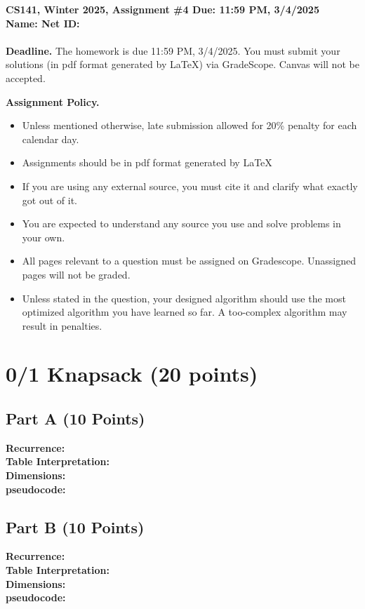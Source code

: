 \documentclass{article}[12pt]
\newcommand{\policy}[1]{#1}
\newcommand{\policy}[1]{}
\newcommand{\deadline}{11:59 PM, 3/4/2025}
\newcommand{\assigntitle}[1]{{
  \noindent \large \bf
  CS141, Winter 2025,
  Assignment \##1 \hfill Due: {\deadline}\\
  Name:  %
  \hspace{2.5in}
  Net ID:  %
  \\
  [-.05in]
  \mbox{}\hrulefill \mbox{}\\}}
\begin{document}
\assigntitle{4}{}
\policy{\textbf{Deadline.} The homework is due 11:59 PM, 3/4/2025. You must submit your solutions (in pdf
format generated by LaTeX) via GradeScope. Canvas will not be accepted.}\\
\date{}
\policy{\textbf{Assignment Policy.}
\begin{itemize}
    \item Unless mentioned otherwise, late submission allowed for 20\% penalty for each calendar day.
    \item Assignments should be in pdf format generated by LaTeX
    \item If you are using any external source, you must cite it and clarify what exactly got out of it.
    \item You are expected to understand any source you use and solve problems in your own.
    \item All pages relevant to a question must be assigned on Gradescope. Unassigned pages will not be graded.
    \item Unless stated in the question, your designed algorithm should use the most optimized algorithm you have learned so far. A too-complex algorithm may result in penalties.
\end{itemize}


}

\section{0/1 Knapsack (20 points)}
\subsection{Part A (10 Points)}

\noindent\textbf{Recurrence:} \\
\noindent\textbf{Table Interpretation:} \\
\noindent\textbf{Dimensions:} \\
\noindent\textbf{pseudocode:} \\

\newpage
\subsection{Part B (10 Points)}
\noindent\textbf{Recurrence:} \\
\noindent\textbf{Table Interpretation:} \\
\noindent\textbf{Dimensions:} \\
\noindent\textbf{pseudocode:} \\
\end{document}
